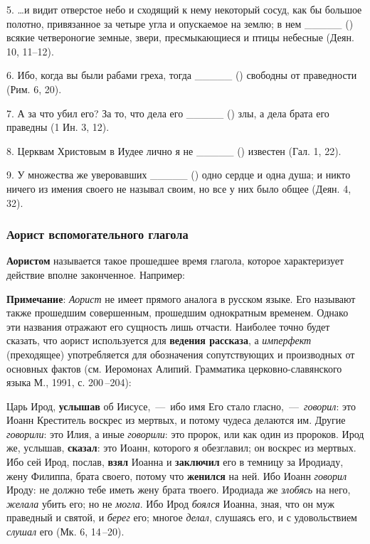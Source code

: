 \documentclass[11pt,a4paper,oneside]{memoir}
\newcommand{\hspca}{\hspace{2.4em}}
\begin{document}
    5. \ldots и видит отверстое небо и сходящий к нему некоторый сосуд, как бы большое полотно, привязанное за четыре угла и опускаемое на землю; в нем _____ ({}) всякие четвероногие земные, звери, пресмыкающиеся и птицы небесные (Деян. 10, 11--12).
    
    6. Ибо, когда вы были рабами греха, тогда _____ ({}) свободны от праведности (Рим. 6, 20).
    
    7. А за что убил его? За то, что дела его _____ ({}) злы, а дела брата его праведны (1 Ин. 3, 12).
    
    8. Церквам Христовым в Иудее лично я не _____ ({}) известен (Гал. 1, 22).
    
    9. У множества же уверовавших _____ ({}) одно сердце и одна душа; и никто ничего из имения своего не называл своим, но все у них было общее (Деян. 4, 32).

                \subsubsection{Аорист вспомогательного глагола {}}

    \textbf{Аористом} называется такое прошедшее время глагола, которое характеризует действие вполне законченное. Например:
    
    
    \bigskip\autorows{l}{1}{l}{
        \hspca{{\slv{То́й речѐ и҆}} {\slv{\large бы́ша}} (Пс. 32, 9)}
    }

    \textbf{Примечание}: \emph{Аорист} не имеет прямого аналога в русском языке. Его называют также прошедшим совершенным, прошедшим однократным временем. Однако эти названия отражают его сущность лишь отчасти. Наиболее точно будет сказать, что аорист используется для \textbf{ведения рассказа}, а \emph{имперфект} (преходящее) употребляется для обозначения сопутствующих и производных от основных фактов (см. Иеромонах Алипий. Грамматика церковно-славянского языка М., 1991, с. 200\,--204):
    
    Царь Ирод, \textbf{услышав} об Иисусе,~---~ибо имя Его стало гласно,~---~\emph{говорил}: это Иоанн Креститель воскрес из мертвых, и потому чудеса делаются им. Другие \emph{говорили}: это Илия, а иные \emph{говорили}: это пророк, или как один из пророков. Ирод же, услышав, \textbf{сказал}: это Иоанн, которого я обезглавил; он воскрес из мертвых. Ибо сей Ирод, послав, \textbf{взял} Иоанна и \textbf{заключил} его в темницу за Иродиаду, жену Филиппа, брата своего, потому что \textbf{женился} на ней. Ибо Иоанн \emph{говорил} Ироду: не должно тебе иметь жену брата твоего. Иродиада же \emph{злобясь} на него, \emph{желала} убить его; но не \emph{могла}. Ибо Ирод \emph{боялся} Иоанна, зная, что он муж праведный и святой, и \emph{берег} его; многое \emph{делал}, слушаясь его, и с удовольствием \emph{слушал} его (Мк. 6, 14\,--20).
    \pagebreak
    
\end{document}
